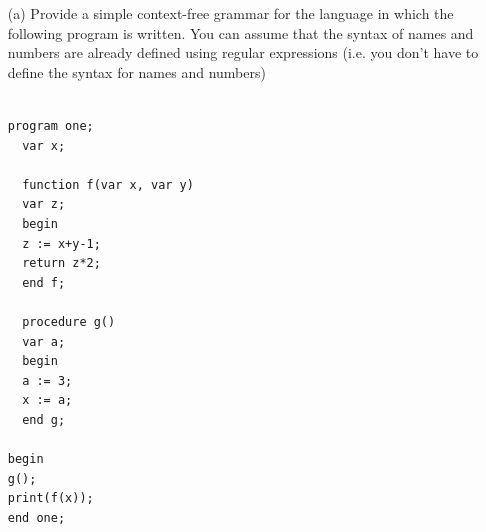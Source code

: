 \documentclass[11pt]{article}
\begin{document}
\begin{itemize}

\item[(a)]Provide a simple context-free grammar for the language in which the following program is
written. You can assume that the syntax of names and numbers are already defined using
regular expressions (i.e. you don’t have to define the syntax for names and numbers)

\begin{lstlisting}

program one;
  var x;
  
  function f(var x, var y)
  var z;
  begin
  z := x+y-1;
  return z*2;
  end f;
  
  procedure g()
  var a;
  begin
  a := 3;
  x := a;
  end g;
  	
begin
g();
print(f(x));
end one;
\end{lstlisting}


\end{itemize}
\end{document}
